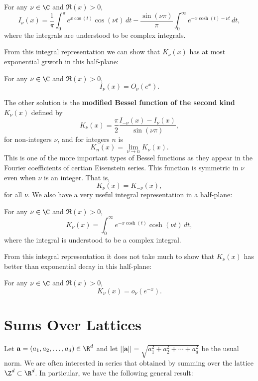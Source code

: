     \begin{proposition}\label{prop:integral_representation_I-Bessel_function}
      For any $\nu \in \C$ and $\Re(x) > 0$,
      \[
        I_{\nu}(x) = \frac{1}{\pi}\int_{0}^{\pi}e^{x\cos(t)}\cos(\nu t)\,dt-\frac{\sin(\nu\pi)}{\pi}\int_{0}^{\infty}e^{-x\cosh(t)-\nu t}\,dt,
      \]
      where the integrals are understood to be complex integrals.
    \end{proposition}

    From this integral representation we can show that $K_{\nu}(x)$ has at most exponential grwoth in this half-plane:

    \begin{lemma}\label{lem:exponential_growth_I-Bessel_function}
      For any $\nu \in \C$ and $\Re(x) > 0$,
      \[
        I_{\nu}(x) = O_{\nu}(e^{x}).
      \]
    \end{lemma}

    The other solution is the \textbf{modified Bessel function of the second kind} $K_{\nu}(x)$ defined by
    \[
      K_{\nu}(x) = \frac{\pi}{2}\frac{I_{-\nu}(x)-I_{\nu}(x)}{\sin(\nu\pi)},
    \]
    for non-integers $\nu$, and for integers $n$ is
    \[
      K_{n}(x)= \lim_{\nu \to n}K_{\nu}(x).
    \]
    This is one of the more important types of Bessel functions as they appear in the Fourier coefficients of certian Eisenstein series. This function is symmetric in $\nu$ even when $\nu$ is an integer. That is,
    \[
      K_{\nu}(x) = K_{-\nu}(x),
    \]
    for all $\nu$. We also have a very useful integral representation in a half-plane:

    \begin{proposition}\label{prop:integral_representation_K-Bessel_function}
      For any $\nu \in \C$ and $\Re(x) > 0$,
      \[
        K_{\nu}(x) = \int_{0}^{\infty}e^{-x\cosh(t)}\cosh(\nu t)\,dt,
      \]
      where the integral is understood to be a complex integral.
    \end{proposition}

    From this integral representation it does not take much to show that $K_{\nu}(x)$ has better than exponential decay in this half-plane:

    \begin{lemma}\label{lem:exponential_decay_K-Bessel_function}
      For any $\nu \in \C$ and $\Re(x) > 0$,
      \[
        K_{\nu}(x) = o_{\nu}(e^{-x}).
      \]
    \end{lemma}
  \section{Sums Over Lattices}
    Let $\mathbf{a} = (a_{1},a_{2},\ldots,a_{d}) \in \R^{d}$ and let $||\mathbf{a}|| = \sqrt{a_{1}^{2}+a_{2}^{2}+\cdots+a_{d}^{2}}$ be the usual norm. We are often interested in series that obtained by summing over the lattice $\Z^{d} \subset \R^{d}$. In particular, we have the following general result:

